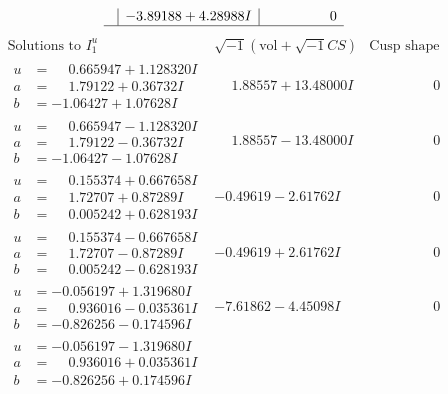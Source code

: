 \documentclass[1p]{elsarticle_modified}
\theoremstyle{definition}
\newcommand{\I}{\sqrt{-1}}
\begin{document}
$$\begin{array}{c|c|c}
 & -3.89188 + 4.28988 I & \phantom{-0.000000 } 0\\
 \hline 
 \end{array}$$\newpage$$\begin{array}{c|c|c}  
\text{Solutions to }I^u_{1}& \I (\text{vol} + \sqrt{-1}CS) & \text{Cusp shape}\\
 \hline 
\begin{aligned}
u &= \phantom{-}0.665947 + 1.128320 I \\
a &= \phantom{-}1.79122 + 0.36732 I \\
b &= -1.06427 + 1.07628 I\end{aligned}
 & \phantom{-}1.88557 + 13.48000 I & \phantom{-0.000000 } 0 \\ \hline\begin{aligned}
u &= \phantom{-}0.665947 - 1.128320 I \\
a &= \phantom{-}1.79122 - 0.36732 I \\
b &= -1.06427 - 1.07628 I\end{aligned}
 & \phantom{-}1.88557 - 13.48000 I & \phantom{-0.000000 } 0 \\ \hline\begin{aligned}
u &= \phantom{-}0.155374 + 0.667658 I \\
a &= \phantom{-}1.72707 + 0.87289 I \\
b &= \phantom{-}0.005242 + 0.628193 I\end{aligned}
 & -0.49619 - 2.61762 I & \phantom{-0.000000 } 0 \\ \hline\begin{aligned}
u &= \phantom{-}0.155374 - 0.667658 I \\
a &= \phantom{-}1.72707 - 0.87289 I \\
b &= \phantom{-}0.005242 - 0.628193 I\end{aligned}
 & -0.49619 + 2.61762 I & \phantom{-0.000000 } 0 \\ \hline\begin{aligned}
u &= -0.056197 + 1.319680 I \\
a &= \phantom{-}0.936016 - 0.035361 I \\
b &= -0.826256 - 0.174596 I\end{aligned}
 & -7.61862 - 4.45098 I & \phantom{-0.000000 } 0 \\ \hline\begin{aligned}
u &= -0.056197 - 1.319680 I \\
a &= \phantom{-}0.936016 + 0.035361 I \\
b &= -0.826256 + 0.174596 I\end{aligned}

\end{array}$$
\end{document}
